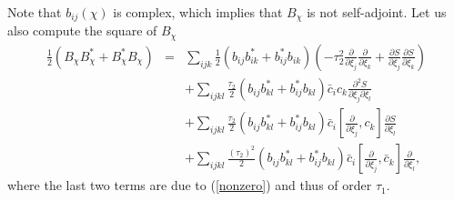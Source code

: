 \documentclass[letterpaper,11pt]{article}
\newcommand{\nn}{\nonumber}
\newcommand{\pa}{\partial}
\begin{document}
Note that $b_{ij}(\chi)$ is complex, which implies that $B_\chi$ is not self-adjoint.
Let us also  compute the square of $B_\chi$  
\begin{eqnarray}
\frac{1}{2}\left( B_\chi B_\chi^*+ B_\chi^* B_\chi \right)&=&  \sum_{ijk}  \frac{1}{2}\left(  b_{ij}  b^*_{ik} +  b^*_{ij}  b_{ik}  \right)  \left(  -\tau_2^2     \frac{\pa}{\pa\xi_{j }}  \frac{\pa}{\pa\xi_{k }}    
+  \frac{\pa S}{\pa \xi_j}\frac{\pa S}{\pa \xi_k}  \right)
\nn\\&&
+ \sum_{ijkl} \frac{\tau_2}{2} \left(  b_{ij} b_{kl}^*+ b_{ij}^* b_{kl} \right) \bar{c}_i   {c}_{k}   \frac{\pa^2 S}{\pa \xi_j\pa \xi_l }      
\nn\\&&
+ \sum_{ijkl} \frac{\tau_2}{2} \left(  b_{ij} b_{kl}^*+ b_{ij}^* b_{kl} \right) \bar{c}_i   \left[\frac{\pa}{\pa \xi_j }  , {c}_{k} \right]  \frac{\pa S}{\pa \xi_l }      
\nn\\&&
+ \sum_{ijkl} \frac{\left(\tau_2\right)^2}{2} \left(  b_{ij} b_{kl}^*+ b_{ij}^* b_{kl} \right) \bar{c}_i  \left[  \frac{\pa}{\pa \xi_j }  , \bar{c}_{k}\right]   \frac{\pa}{\pa \xi_l }  ,
\label{b2}
\end{eqnarray}
where the last two terms are due to (\ref{nonzero}) and thus of order $\tau_1$.
\end{document}
